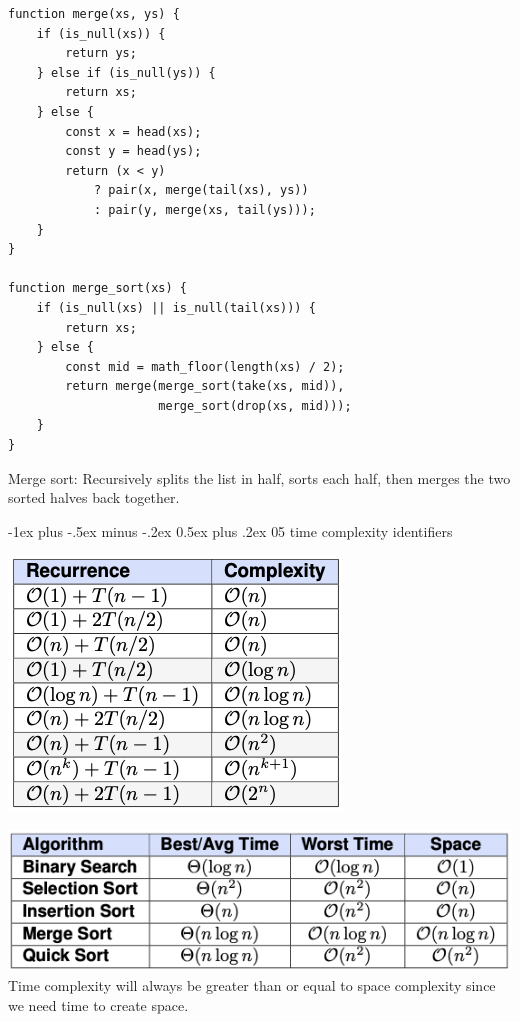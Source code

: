 \documentclass[10pt, landscape]{article}
\makeatletter
\renewcommand{\section}{\@startsection{section}{1}{0mm}%
                                {-1ex plus -.5ex minus -.2ex}%
                                {0.5ex plus .2ex}%
                                {\normalfont\large\bfseries}}
\makeatother
\begin{document}
\begin{multicols}{4}
\begin{verbatim}
function merge(xs, ys) {
    if (is_null(xs)) { 
        return ys;
    } else if (is_null(ys)) { 
        return xs;
    } else {
        const x = head(xs);
        const y = head(ys);
        return (x < y) 
            ? pair(x, merge(tail(xs), ys))
            : pair(y, merge(xs, tail(ys)));
    }
}

function merge_sort(xs) {
    if (is_null(xs) || is_null(tail(xs))) {
        return xs;
    } else {
        const mid = math_floor(length(xs) / 2);  
        return merge(merge_sort(take(xs, mid)), 
                     merge_sort(drop(xs, mid)));
    }
}
\end{verbatim}
Merge sort: Recursively splits the list in half, sorts each half, then merges the two sorted halves back together.

\section{05 time complexity identifiers} 
\begin{center}
    \includegraphics[width=\linewidth]{recurrence relation.png}
\end{center}

\begin{center}
    \includegraphics[width=\linewidth]{sorts time complexities.png}
Time complexity will always be greater than or equal to space complexity since we need time to create space.
\end{center}



\end{multicols}
\end{document}
